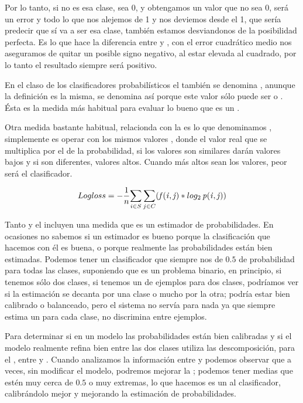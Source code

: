 Por lo tanto, si no es esa clase, sea 0, y obtengamos un valor que no sea 0, será un error y todo lo que nos alejemos de 1 y nos deviemos desde el 1, que sería predecir que sí va a ser esa clase, también estamos desviandonos de la posibilidad perfecta. Es lo que hace la diferencia entre  y , con el error cuadrático medio nos aseguramos de quitar un posible signo negativo, al estar elevada al cuadrado, por lo tanto el resultado siempre será positivo.

En el claso de los clasificadores probabilísticos el  también se denomina , anunque la definición es la misma, se denomina así porque este valor sólo puede ser  o . Ésta es la medida más habitual para evaluar lo bueno que es un .

Otra medida bastante habitual, relacionda con la  es lo que denominamos , simplemente es operar con los mismos valores , donde el valor real que se multiplica por el  de la probabilidad, si los valores son similares darán valores bajos y si son diferentes, valores altos. Cuando más altos sean los valores, peor será el clasificador.

\begin{equation*}
    Logloss = -\frac{1}{n}\displaystyle{\sum_{i\in S}\sum_{j\in C}(\ensuremath{\mathit{f(i,j)} }\ast log_{2}\,\ensuremath{\mathit{p(i,j)} })}
\end{equation*}

Tanto  y el  incluyen una medida que es un estimador de probabilidades. En ocasiones no sabemos si un estimador es bueno porque la clasificación  que hacemos con él es buena, o porque realmente las probabilidades están bien estimadas. Podemos tener un clasificador que siempre nos de $0.5$ de probabilidad para todas las clases, suponiendo que es un problema binario, en principio, si tenemos sólo dos clases, si tenemos un  de ejemplos para dos clases, podríamos ver si la estimación se decanta por una clase o mucho por la otra; podría estar bien calibrado o balanceado, pero el sistema no servía para nada ya que siempre estima un  para cada clase, no discrimina entre ejemplos.

Para determinar si en un modelo las probabilidades están bien calibradas y si el modelo realmente refina bien entre las dos clases utiliza las descomposición, para el , entre  y . Cuando analizamos la información entre  y  podemos observar que a veces, sin modificar el modelo, podremos mejorar la ; podemos tener medias que estén muy cerca de $0.5$ o muy extremas, lo que hacemos es un  al clasificador, calibrándolo mejor y mejorando la estimación de probabilidades.

